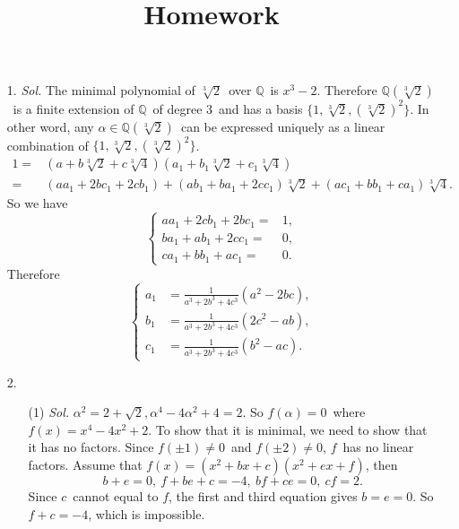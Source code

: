 \documentclass[12pt]{article}
\title{Homework}
\newcommand{\Q}{\mathbb{Q}}
\newcommand\Myperm[2][^n]{\prescript{#1\mkern-2.5mu}{}P_{#2}}
\newcommand\Mycomb[2][^n]{\prescript{#1\mkern-0.5mu}{}C_{#2}}
\begin{document}
	




\begin{enumerate}
	\item[1.]
	\textit{Sol.}
		The minimal polynomial of $\sqrt[3]{2}$\ over $\Q$\ is $x^3-2$. Therefore $\Q(\sqrt[3]{2})$\ is a finite extension of $\Q$\ of degree $3$\ and has a basis $\{1,\sqrt[3]{2},(\sqrt[3]{2})^2\}$. In other word, any $\alpha\in\Q(\sqrt[3]{2})$\ can be expressed uniquely as a linear combination of $\{1,\sqrt[3]{2},(\sqrt[3]{2})^2\}$.
		$$\begin{aligned}
			1
			=&(a+b\sqrt[3]{2}+c\sqrt[3]{4})(a_1+b_1\sqrt[3]{2}+c_1\sqrt[3]{4})\\
			=&(aa_1+2bc_1+2cb_1)+(ab_1+ba_1+2cc_1)\sqrt[3]{2}+(ac_1+bb_1+ca_1)\sqrt[3]{4}.
		\end{aligned}$$
		So we have
		$$\left\{
		\begin{array}{rcl}
		aa_1+2cb_1+2bc_1=&1,\\
		ba_1+ab_1+2cc_1=&0,\\
		ca_1+bb_1+ac_1=&0.
		\end{array}
		\right.$$
		Therefore
		$$\left\{
		\begin{array}{rcl}
			a_1&=\frac{1}{a^3+2b^3+4c^3}(a^2-2bc),\\
			b_1&=\frac{1}{a^3+2b^3+4c^3}(2c^2-ab),\\
			c_1&=\frac{1}{a^3+2b^3+4c^3}(b^2-ac).
		\end{array}
		\right.$$
	\item[2.]
	\begin{enumerate}
		\item[(1)]
		\textit{Sol.}
			$\alpha^2=2+\sqrt{2}, \alpha^4-4\alpha^2+4=2$. So $f(\alpha)=0$\ where $f(x)=x^4-4x^2+2$. To show that it is minimal, we need to show that it has no factors. Since $f(\pm1)\neq0$\ and $f(\pm2)\neq0$, $f$\ has no linear factors. Assume that $f(x)=(x^2+bx+c)(x^2+ex+f)$, then
			$$b+e=0,\ f+be+c=-4,\ bf+ce=0,\ cf=2.$$
			Since $c$\ cannot equal to $f$, the first and third equation gives $b=e=0$. So $f+c=-4$, which is impossible.

\end{enumerate}
\end{enumerate}
\end{document}

